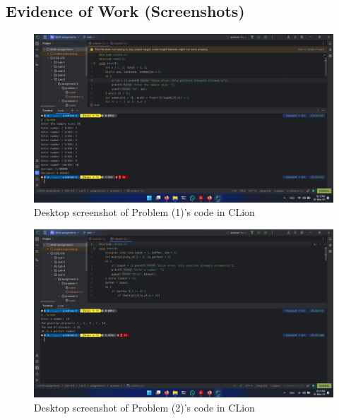 \documentclass[a4paper,11pt]{article}
\theoremstyle{mytheor}
\theoremstyle{mytheor}
\begin{document}
\subsection{Evidence of Work (Screenshots)}
\begin{figure}[!h]
    \centering
    \includegraphics[width=\linewidth]{assets/prob-1.png}
    \caption{Desktop screenshot of Problem (1)'s code in CLion}
\end{figure}
\begin{figure}[!h]
    \centering
    \includegraphics[width=\linewidth]{assets/prob-2.png}
    \caption{Desktop screenshot of Problem (2)'s code in CLion}
\end{figure}
\newpage
\end{document}
